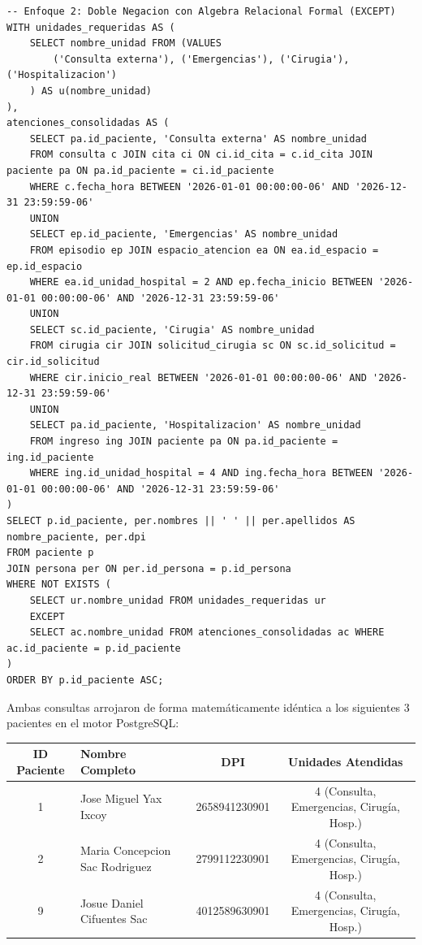 \documentclass[11pt,a4paper]{article}
\begin{document}
\begin{lstlisting}[style=sqlstyle]
-- Enfoque 2: Doble Negacion con Algebra Relacional Formal (EXCEPT)
WITH unidades_requeridas AS (
    SELECT nombre_unidad FROM (VALUES 
        ('Consulta externa'), ('Emergencias'), ('Cirugia'), ('Hospitalizacion')
    ) AS u(nombre_unidad)
),
atenciones_consolidadas AS (
    SELECT pa.id_paciente, 'Consulta externa' AS nombre_unidad
    FROM consulta c JOIN cita ci ON ci.id_cita = c.id_cita JOIN paciente pa ON pa.id_paciente = ci.id_paciente
    WHERE c.fecha_hora BETWEEN '2026-01-01 00:00:00-06' AND '2026-12-31 23:59:59-06'
    UNION
    SELECT ep.id_paciente, 'Emergencias' AS nombre_unidad
    FROM episodio ep JOIN espacio_atencion ea ON ea.id_espacio = ep.id_espacio
    WHERE ea.id_unidad_hospital = 2 AND ep.fecha_inicio BETWEEN '2026-01-01 00:00:00-06' AND '2026-12-31 23:59:59-06'
    UNION
    SELECT sc.id_paciente, 'Cirugia' AS nombre_unidad
    FROM cirugia cir JOIN solicitud_cirugia sc ON sc.id_solicitud = cir.id_solicitud
    WHERE cir.inicio_real BETWEEN '2026-01-01 00:00:00-06' AND '2026-12-31 23:59:59-06'
    UNION
    SELECT pa.id_paciente, 'Hospitalizacion' AS nombre_unidad
    FROM ingreso ing JOIN paciente pa ON pa.id_paciente = ing.id_paciente
    WHERE ing.id_unidad_hospital = 4 AND ing.fecha_hora BETWEEN '2026-01-01 00:00:00-06' AND '2026-12-31 23:59:59-06'
)
SELECT p.id_paciente, per.nombres || ' ' || per.apellidos AS nombre_paciente, per.dpi
FROM paciente p
JOIN persona per ON per.id_persona = p.id_persona
WHERE NOT EXISTS (
    SELECT ur.nombre_unidad FROM unidades_requeridas ur
    EXCEPT
    SELECT ac.nombre_unidad FROM atenciones_consolidadas ac WHERE ac.id_paciente = p.id_paciente
)
ORDER BY p.id_paciente ASC;
\end{lstlisting}

Ambas consultas arrojaron de forma matemáticamente idéntica a los siguientes 3 pacientes en el motor PostgreSQL:
\begin{table}[H]
\centering
\small
\begin{tabular}{|c|l|c|c|}
\hline
\textbf{ID Paciente} & \textbf{Nombre Completo} & \textbf{DPI} & \textbf{Unidades Atendidas} \\
\hline
1 & Jose Miguel Yax Ixcoy & 2658941230901 & 4 (Consulta, Emergencias, Cirugía, Hosp.) \\
2 & Maria Concepcion Sac Rodriguez & 2799112230901 & 4 (Consulta, Emergencias, Cirugía, Hosp.) \\
9 & Josue Daniel Cifuentes Sac & 4012589630901 & 4 (Consulta, Emergencias, Cirugía, Hosp.) \\
\hline
\end{tabular}
\end{table}
\end{document}
